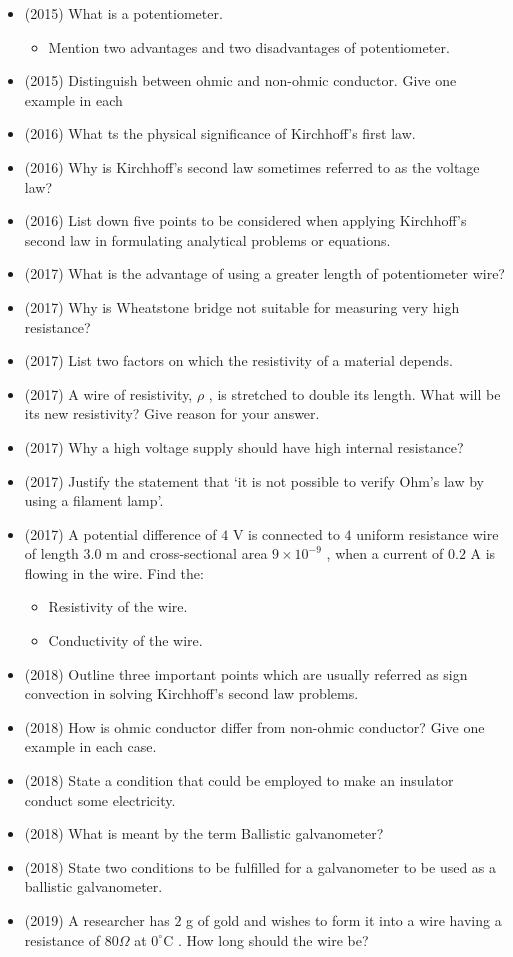 \documentclass{article}
\begin{document}
\begin{itemize}
\begin{itemize}
\end{itemize}
\item (2015)  What is a potentiometer. 
 \begin{itemize}
\item Mention two advantages and two disadvantages of potentiometer.
\end{itemize}
\item (2015)  Distinguish between ohmic and non-ohmic conductor. Give one example in each
\item (2016)  What ts the physical significance of Kirchhoff’s first law.
\item (2016)  Why is Kirchhoff’s second law sometimes referred to as the voltage law?
\item (2016)  List down five points to be considered when applying Kirchhoff’s second law in formulating analytical problems or equations.
\item (2017)  What is the advantage of using a greater length of potentiometer wire?
\item (2017)  Why is Wheatstone bridge not suitable for measuring very high resistance?
\item (2017)  List two factors on which the resistivity of a material depends. 
\item (2017)  A wire of resistivity, $ \rho $ , is stretched to double its length. What will be its new resistivity? Give reason for your answer. 
\item (2017)  Why a high voltage supply should have high internal resistance?
\item (2017)  Justify the statement that ‘it is not possible to verify Ohm's law by using a filament lamp’.
\item (2017)  A potential difference of $ 4$ V is connected to $ 4$ uniform resistance wire of length $ 3.0$ m and cross-sectional area $ 9\times 10^{-9}$ , when a current of $ 0.2$ A is flowing in the wire. Find the:
 \begin{itemize}
\item Resistivity of the wire.
\item Conductivity of the wire. 
\end{itemize}
\item (2018)  Outline three important points which are usually referred as sign convection in  solving Kirchhoff’s second law problems. 
\item (2018)  How is ohmic conductor differ from non-ohmic conductor? Give one example in each case. 
\item (2018)  State a condition that could be employed to make an insulator conduct some electricity. 
\item (2018)  What is meant by the term Ballistic galvanometer? 
\item (2018)  State two conditions to be fulfilled for a galvanometer to be used as a ballistic galvanometer. 
\item (2019)  A researcher has $ 2$ g of gold and wishes to form it into a wire having a resistance of $ 80\Omega $ at $ 0^{\circ}$C . How long should the wire be? 
\end{itemize}
\end{document}
